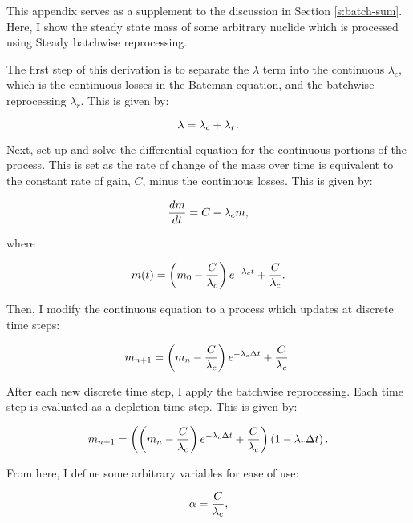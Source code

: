 This appendix serves as a supplement to the discussion in Section \ref{s:batch-sum}.
Here, I show the steady state mass of some arbitrary nuclide which is processed using Steady batchwise reprocessing.

The first step of this derivation is to separate the $\lambda$ term into the continuous $\lambda_c$, which is the continuous losses in the Bateman equation, and the batchwise reprocessing $\lambda_r$.
This is given by:

\begin{equation} \hfill
\lambda = \lambda_c + \lambda_r.
\hfill \end{equation}

Next, set up and solve the differential equation for the continuous portions of the process.
This is set as the rate of change of the mass over time is equivalent to the constant rate of gain, $C$, minus the continuous losses.
This is given by:

\begin{equation} \hfill
\frac{dm}{dt} = C - \lambda_c m,
\hfill \end{equation}

where

\begin{equation} \hfill
m(t) = \left(m_0 - \frac{C}{\lambda_c} \right) e^{-\lambda_c t}  + \frac{C}{\lambda_c}.
\hfill \end{equation}

Then, I modify the continuous equation to a process which updates at discrete time steps:

\begin{equation} \hfill
m_{n+1} = \left(m_n - \frac{C}{\lambda_c} \right) e^{-\lambda_c \Delta t}  + \frac{C}{\lambda_c}.
\hfill \end{equation}

After each new discrete time step, I apply the batchwise reprocessing. 
Each time step is evaluated as a depletion time step.
This is given by:

\begin{equation} \hfill
m_{n+1} = \left(\left(m_n - \frac{C}{\lambda_c} \right) e^{-\lambda_c \Delta t}  + \frac{C}{\lambda_c}\right) \left(1 - {\lambda_r \Delta t} \right).
\hfill \label{eq:nplusone}\end{equation}

From here, I define some arbitrary variables for ease of use:

\begin{equation} \hfill
\alpha = \frac{C}{\lambda_c},
\hfill \end{equation}

